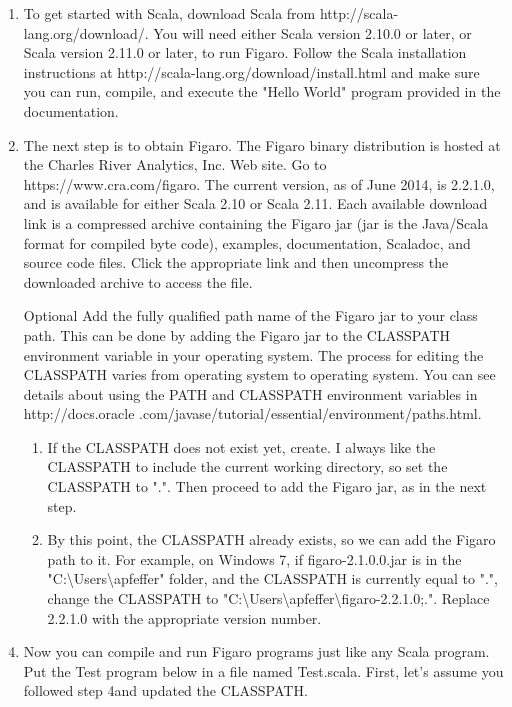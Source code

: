 \begin{enumerate}
\item To get started with Scala, download Scala from http://scala-lang.org/download/. You will need either Scala version 2.10.0 or later, or Scala version 2.11.0 or later, to run Figaro. Follow the Scala installation instructions at http://scala-lang.org/download/install.html and make sure you can run, compile, and execute the "Hello World" program provided in the documentation.
\item The next step is to obtain Figaro. The Figaro binary distribution is hosted at the Charles River Analytics, Inc. Web site. Go to https://www.cra.com/figaro. The current version, as of June 2014, is 2.2.1.0, and is available for either Scala 2.10 or Scala 2.11. Each available download link is a compressed archive containing the Figaro jar (jar is the Java/Scala format for compiled byte code), examples, documentation, Scaladoc, and source code files. Click the appropriate link and then uncompress the downloaded archive to access the file.
\item [Optional] Add the fully qualified path name of the Figaro jar to your class path. This can be done by adding the Figaro jar to the CLASSPATH environment variable in your operating system. The process for editing the CLASSPATH varies from operating system to operating system. You can see details about using the PATH and CLASSPATH environment variables in http://docs.oracle
\newline .com/javase/tutorial/essential/environment/paths.html.
\begin{enumerate}
\item If the CLASSPATH does not exist yet, create. I always like the CLASSPATH to include the current working directory, so set the CLASSPATH to ".". Then proceed to add the Figaro jar, as in the next step. 
\item By this point, the CLASSPATH already exists, so we can add the Figaro path to it. For example, on Windows 7, if figaro-2.1.0.0.jar is in the "C:\textbackslash Users\textbackslash apfeffer" folder, and the CLASSPATH is currently equal to ".", change the CLASSPATH to "C:\textbackslash Users\textbackslash apfeffer\textbackslash figaro-2.2.1.0;.". Replace 2.2.1.0 with the appropriate version number. 
\end{enumerate}
\item Now you can compile and run Figaro programs just like any Scala program. Put the Test program below in a file named Test.scala. First, let's assume you followed step 4and updated the CLASSPATH.

\end{enumerate}
